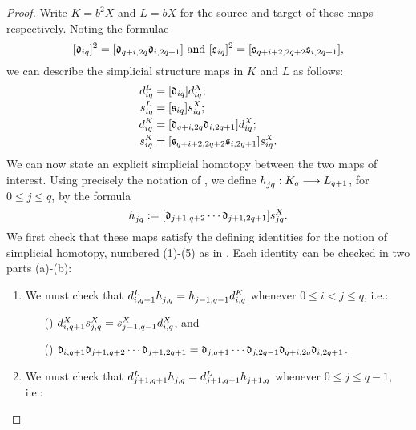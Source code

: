 \documentclass[11pt]{amsart} \renewcommand{\baselinestretch}{1.2}
\theoremstyle{plain}
\numberwithin{equation}{section} %
\theoremstyle{plain}
\numberwithin{equation}{chapter} %
\renewcommand{\to}{\longrightarrow}
\newcommand{\squishlist}{
}
\newcommand{\fraks}{\mathfrak{s}}
\newcommand{\frakd}{\mathfrak{d}}
\newcommand{\citeBOX}[2][]{\cite[\mbox{#1}]{#2}}
\newcommand{\trip}[3]{{#1}_{\smash{#2}}^{\smash{#3}}}
\newcommand{\barConstructionMightAbbreviate}{b}
\begin{document}
\begin{Bousfield-Kan spectral sequence}
\begin{proof}
Write $K=\barConstructionMightAbbreviate ^{2}X$ and $L=\barConstructionMightAbbreviate X$ for the source and target of these maps respectively. Noting the formulae
\[[\frakd_{iq}]^2= [\frakd_{q+i,2q}\circ\frakd_{i,2q+1}]\ \textup{and}\  [\fraks_{iq}]^2= [\fraks_{q+i+2,2q+2}\circ\fraks_{i,2q+1}],\]
we can describe the simplicial structure maps in $K$ and $L$ as follows:
\begin{alignat*}{2}
\trip{d}{iq}{L}&=[\frakd_{iq}]\trip{d}{iq}{X};\\
\trip{s}{iq}{L}&=[\fraks_{iq}]\trip{s}{iq}{X};\\
\trip{d}{iq}{K}&=[\frakd_{q+i,2q}\circ\frakd_{i,2q+1}]\trip{d}{iq}{X};\\
\trip{s}{iq}{K}&=[\fraks_{q+i+2,2q+2}\circ\fraks_{i,2q+1}]\trip{s}{iq}{X}.
\end{alignat*}
We can now state an explicit simplicial homotopy between the two maps of interest. Using precisely the notation of \citeBOX[\S5]{MaySimpObj.pdf}, we define $\trip{h}{jq}{}:K_q\to L_{q+1}$, for $0\leq j\leq q$, by the formula
\[\trip{h}{jq}{}:=[\frakd_{j+1,q+2}\circ\cdots \circ\frakd_{j+1,2q+1}]\trip{s}{jq}{X}.\]
We first check that these maps satisfy the defining identities for the notion of simplicial homotopy, numbered (1)-(5) as in \citeBOX[\S5]{MaySimpObj.pdf}. Each identity can be checked in two parts (a)-(b):
{\renewcommand{\circ}{\relax}
\begin{enumerate}\squishlist
\setlength{\parindent}{.25in}
\item We must check that $\trip{d}{i,q+1}{L}\circ \trip{h}{j,q}{}=\trip{h}{j-1,q-1}{}\circ \trip{d}{i,q}{K}$ whenever $0\leq i<j\leq q$, i.e.:
\begin{enumerate}\squishlist
\setlength{\parindent}{.25in}
\item[({\makebox[.51em][c]{a}})] $\trip{d}{i,q+1}{X}\circ \trip{s}{j,q}{X}=\trip{s}{j-1,q-1}{X}\circ \trip{d}{i,q}{X}$,\textup{ and}%
\item[({\makebox[.51em][c]{b}})]
$\frakd_{i,q+1}\circ
\frakd_{j+1,q+2}\circ\cdots \circ\frakd_{j+1,2q+1}=
\frakd_{j,q+1}\circ\cdots \circ\frakd_{j,2q-1}\circ
\frakd_{q+i,2q}\circ\frakd_{i,2q+1}$.
\end{enumerate}
\item We must check that $\trip{d}{j+1,q+1}{L}\circ \trip{h}{j,q}{}=\trip{d}{j+1,q+1}{L}\circ \trip{h}{j+1,q}{}$ whenever $0\leq j\leq q-1$, i.e.:
\begin{enumerate}\squishlist

\end{enumerate}
\end{enumerate}}
\end{proof}
\end{Bousfield-Kan spectral sequence}
\end{document}
